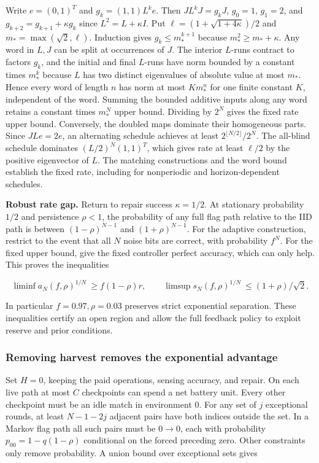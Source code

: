 \documentclass[
  11pt,
]{article}
\begin{document}
Write \(e=(0,1)^T\) and \(g_k=(1,1)L^k e\). Then \(JL^kJ=g_kJ\),
\(g_0=1\), \(g_1=2\), and \(g_{k+2}=g_{k+1}+\kappa g_k\) since
\(L^2=L+\kappa I\). Put \(\ell=(1+\sqrt{1+4\kappa})/2\) and
\(m_*=\max(\sqrt2,\ell)\). Induction gives \(g_k\le m_*^{k+1}\) because
\(m_*^2\ge m_*+\kappa\). Any word in \(L,J\) can be split at occurrences
of \(J\). The interior \(L\)-runs contract to factors \(g_k\), and the
initial and final \(L\)-runs have norm bounded by a constant times
\(m_*^k\) because \(L\) has two distinct eigenvalues of absolute value
at most \(m_*\). Hence every word of length \(n\) has norm at most
\(K m_*^n\) for one finite constant \(K\), independent of the word.
Summing the bounded additive inputs along any word retains a constant
times \(m_*^N\) upper bound. Dividing by \(2^N\) gives the fixed rate
upper bound. Conversely, the doubled maps dominate their homogeneous
parts. Since \(JL e=2e\), an alternating schedule achieves at least
\(2^{\lfloor N/2\rfloor}/2^N\). The all-blind schedule dominates
\((L/2)^N(1,1)^T\), which gives rate at least \(\ell/2\) by the positive
eigenvector of \(L\). The matching constructions and the word bound
establish the fixed rate, including for nonperiodic and
horizon-dependent schedules.

\textbf{Robust rate gap.} Return to repair success \(\kappa=1/2\). At
stationary probability \(1/2\) and persistence \(\rho<1\), the
probability of any full flag path relative to the IID path is between
\((1-\rho)^{N-1}\) and \((1+\rho)^{N-1}\). For the adaptive
construction, restrict to the event that all \(N\) noise bits are
correct, with probability \(f^N\). For the fixed upper bound, give the
fixed controller perfect accuracy, which can only help. This proves the
inequalities

\[
\liminf a_N(f,\rho)^{1/N}\ \ge f(1-\rho)r,\qquad
\limsup s_N(f,\rho)^{1/N}\ \le(1+\rho)/\sqrt2 .
\]

In particular \(f=0.97,\rho=0.03\) preserves strict exponential
separation. These inequalities certify an open region and allow the full
feedback policy to exploit reserve and prior conditions.

\subsubsection{Removing harvest removes the exponential
advantage}\label{removing-harvest-removes-the-exponential-advantage}

Set \(H=0\), keeping the paid operations, sensing accuracy, and repair.
On each live path at most \(C\) checkpoints can spend a net battery
unit. Every other checkpoint must be an idle match in environment \(0\).
For any set of \(j\) exceptional rounds, at least \(N-1-2j\) adjacent
pairs have both indices outside the set. In a Markov flag path all such
pairs must be \(0\to0\), each with probability \(p_{00}=1-q(1-\rho)\)
conditional on the forced preceding zero. Other constraints only remove
probability. A union bound over exceptional sets gives
\end{document}
